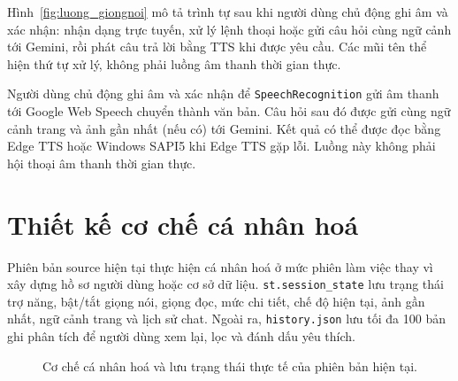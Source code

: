 Hình~\ref{fig:luong_giongnoi} mô tả trình tự sau khi người dùng chủ động
ghi âm và xác nhận: nhận dạng trực tuyến, xử lý lệnh thoại hoặc gửi câu hỏi
cùng ngữ cảnh tới Gemini, rồi phát câu trả lời bằng TTS khi được yêu cầu.
Các mũi tên thể hiện thứ tự xử lý, không phải luồng âm thanh thời gian thực.

Người dùng chủ động ghi âm và xác nhận để \texttt{SpeechRecognition} gửi âm
thanh tới Google Web Speech chuyển thành văn bản. Câu hỏi sau đó được gửi cùng
ngữ cảnh trang và ảnh gần nhất (nếu có) tới Gemini. Kết quả có thể được đọc
bằng Edge TTS hoặc Windows SAPI5 khi Edge TTS gặp lỗi. Luồng này không phải
hội thoại âm thanh thời gian thực.

\section{Thiết kế cơ chế cá nhân hoá}

Phiên bản source hiện tại thực hiện cá nhân hoá ở mức phiên làm việc thay vì
xây dựng hồ sơ người dùng hoặc cơ sở dữ liệu. \texttt{st.session\_state} lưu trạng thái
trợ năng, bật/tắt giọng nói, giọng đọc, mức chi tiết, chế độ hiện tại, ảnh gần nhất,
ngữ cảnh trang và lịch sử chat. Ngoài ra, \texttt{history.json} lưu tối đa 100 bản ghi
phân tích để người dùng xem lại, lọc và đánh dấu yêu thích.

\begin{figure}[H]
\centering
{}
\caption{Cơ chế cá nhân hoá và lưu trạng thái thực tế của phiên bản hiện tại.}
\label{fig:canhanhoa}
\end{figure}

